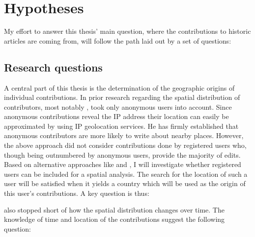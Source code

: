 \chapter{Hypotheses}\label{ch:hypotheses}

My effort to answer this thesis' main question, where the contributions to historic articles are coming from, will follow the path laid out by a set of questions:

\section{Research questions}

A central part of this thesis is the determination of the geographic origins of individual contributions.
In prior research regarding the spatial distribution of contributors, most notably , \textcite[see 3.4.2]{hardy2011volunteered} took only anonymous users into account.
Since anonymous contributions reveal the IP address their location can easily be approximated by using IP geolocation services.
He has firmly established that anonymous contributors are more likely to write about nearby places.
However, the above approach did not consider contributions done by registered users who, though being outnumbered by anonymous users, provide the majority of edits.
Based on alternative approaches like \textcite{lieberman2009you} and \textcite{engelhardt2010geographic}, I will investigate whether registered users can be included for a spatial analysis.
The search for the location of such a user will be satisfied when it yields a country which will be used as the origin of this user's contributions.
A key question is thus:


\textcite{hardy2011volunteered} also stopped short of how the spatial distribution changes over time.
The knowledge of time and location of the contributions suggest the following question:


